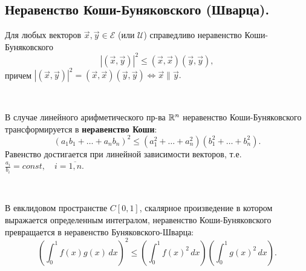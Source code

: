 \subsection{
    Неравенство Коши-Буняковского (Шварца).
}

\begin{theorem}
    Для любых векторов $\vec{x}, \vec{y} \in \mathcal{E}$ (или $\mathcal{U}$) справедливо неравенство Коши-Буняковского
    $$|(\vec{x}, \vec{y})|^2 \leq (\vec{x}, \vec{x}) (\vec{y}, \vec{y}),$$
    причем $|(\vec{x}, \vec{y})|^2 = (\vec{x}, \vec{x}) (\vec{y}, \vec{y}) \iff \vec{x} \parallel \vec{y}.$
\end{theorem}

\begin{corollary}~

    В случае линейного арифметического пр-ва $\mathbb{R}^n$ неравенство Коши-Буняковского трансформируется в \textbf{неравенство Коши}:
    $$(a_1b_1 + \ldots + a_nb_n)^2 \leq (a_1^2 + \ldots + a_n^2)(b_1^2 + \ldots + b_n^2).$$
    Равенство достигается при линейной зависимости векторов, т.е. $\frac{a_i}{b_i} = const, \quad i = \overline{1, n}$.
\end{corollary}

\begin{corollary}~

    В евклидовом пространстве $C[0, 1]$, скалярное произведение в котором выражается определенным интегралом, неравенство Коши-Буняковского превращается в неравенство Буняковского-Шварца:
    $$\left( \int_0^1 f(x)g(x) \, dx \right)^2 \le \left( \int_0^1 f(x)^2 \, dx \right) \left( \int_0^1 g(x)^2 \, dx \right).$$
\end{corollary}
